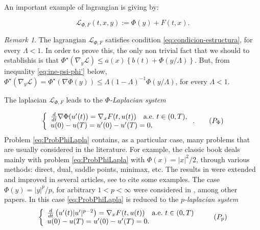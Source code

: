 \documentclass[twoside]{article}
\theoremstyle{remark}
\newtheorem{comentario}{Remark}
\newcounter{example}[section]
\renewcommand{\leq}{\leqslant}
\begin{document}
An important example of lagrangian  is giving by:

\begin{equation}\label{eq:lagrange_phi}
\mathcal{L}_{\Phi,F}(t,x,y):=\Phi(y)+F(t,x).
\end{equation}


\begin{comentario}\label{com:lphi-satis S}
 The lagrangian $\mathcal{L}_{\Phi,F}$ satisfies condition  \eqref{eq:condicion-estructura}, for every $\Lambda<1$. In order to prove this, the only non trivial fact that we should to establishis is that $ \Phi^{\star}(\nabla_{y}\mathcal{L})
\leq
a(x)\left\{b(t)+ \Phi\left({y}/{\Lambda}\right)\right\}$. But, from inequality \eqref{eq:ine-psi-phi'} below, 
$\Phi^{\star}(\nabla_{y}\mathcal{L})=\Phi^{\star}\left(\nabla\Phi(y)\right)\leq \Lambda(1-\Lambda)^{-1} \Phi(y/\Lambda )$, for every $\Lambda<1$.
\end{comentario}




The laplacian $\mathcal{L}_{\Phi,F}$ leads to the \emph{$\Phi$-Laplacian system}

\begin{equation}\label{eq:ProbPhiLapla}
    \left\{%
\begin{array}{ll}
  \frac{d}{dt} \nabla \Phi(u'(t))= \nabla_{x}F(t,u(t)) \quad \hbox{a.e.}\ t \in (0,T),\\
    u(0)-u(T)=u'(0)-u'(T)=0,
\end{array}%
\right. .\tag{${P_{\Phi}}$}
\end{equation}
Problem \eqref{eq:ProbPhiLapla} contains, as a particular case, many problems that are usually considered in the literature.  For example, the classic book  \cite{mawhin2010critical} deals mainly with problem \eqref{eq:ProbPhiLapla} with $\Phi(x)=|x|^2/2$, through various methods: direct, dual, saddle points,  minimax, etc. The results in \cite{mawhin2010critical} were extended and improved in several articles,  see  \cite{tang1998periodic,tang2001periodic,tang1995periodic,wu1999periodic,zhao2004periodic}  to cite some examples. The case $\Phi(y)=|y|^p/p$, for arbitrary $1<p<\infty$ were considered in  \cite{tang2010periodic,Tian2007192}, among other papers. In this case \eqref{eq:ProbPhiLapla} is reduced to the \emph{$p$-laplacian system}
\begin{equation}\label{ProbP-lapla}
    \left\{%
\begin{array}{ll}
   \frac{d}{dt}\left(u'(t)|u'|^{p-2}\right) = \nabla_x F(t,u(t)) \quad \hbox{a.e.}\ t \in (0,T)\\
    u(0)-u(T)=u'(0)-u'(T)=0.
\end{array}%
\right.\tag{${P_p}$}
\end{equation}
\end{document}

